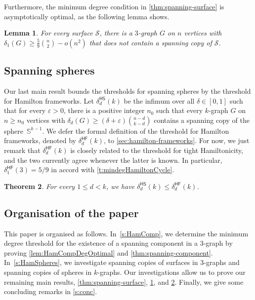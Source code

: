 \documentclass[12pt,reqno]{amsart}
\theoremstyle{plain}
\newtheorem{theorem}{Theorem}[section]
\newtheorem{lemma}[theorem]{Lemma}
\theoremstyle{definition}
\numberwithin{equation}{section}
\newcommand{\eps}{\varepsilon}
\newcommand{\cS}{\mathcal{S}}
\DeclareMathOperator{\hf}{\mathsf{HF}}
\DeclareMathOperator{\hs}{\mathsf{HS}}
\begin{document}
	Furthermore, the minimum degree condition in \cref{thm:spanning-surface} is asymptotically optimal, as the following lemma shows.
	
	\begin{lemma}\label{lem: 5/9 is optimal}
		For every surface $\cS$, there is a $3$-graph $G$ on $n$ vertices with $\delta_1(G)\ge \frac{5}{9}\binom{n}{2}-o(n^2)$ that does not contain a spanning copy of $\cS$.
	\end{lemma}



    
	\subsection{Spanning spheres}
	
	Our last main result bounds the thresholds for   spanning spheres by the threshold for Hamilton frameworks.
	Let $\delta_d^{\hs}(k)$ be the infimum over all $\delta \in [0,1]$ such that for every $\eps>0$, there is a positive integer $n_0$ such that every $k$-graph $G$ on $n \geq n_0$ vertices with $\delta_d(G) \geq (\delta + \eps ) \binom{n-d}{k-d}$ contains a spanning copy of the sphere~$\mathbb{S}^{k-1}$.
	We defer the formal definition of the threshold for Hamilton frameworks, denoted by $\delta_d^{\hf}(k)$, to \cref{sec:hamilton-frameworks}.
	For now, we just remark that $\delta_d^{\hf}(k)$  is closely related to the threshold for tight Hamiltonicity, and the two currently agree whenever the latter is known.
	In particular, $\delta_1^{\hf}(3) = 5/9$ in accord with \cref{t:mindegHamiltonCycle}.
	
	\begin{theorem}\label{thm:spanning-spheres-hamilton-framework}
		For every $1 \leq d < k$, we have $\delta_d^{\hs}(k) \leq \delta_d^{\hf}(k)$.
	\end{theorem}



    
	\subsection*{Organisation of the paper}
	
	This paper is organised as follows. In~\cref{s:HamComp}, we determine the minimum degree threshold for the existence of a spanning component in a $3$-graph by proving \cref{lem:HamCompDegOptimal} and \cref{thm:spanning-component}.
	In~\cref{s:HamSpheres}, we investigate spanning copies of surfaces in $3$-graphs and spanning copies of spheres in $k$-graphs. Our investigations allow us to prove our remaining main results, \cref{thm:spanning-surface}, \cref{lem: 5/9 is optimal}, and \cref{thm:spanning-spheres-hamilton-framework}. Finally, we give some concluding remarks in \cref{s:conc}.
\end{document}
